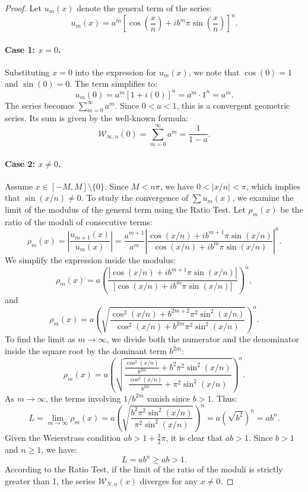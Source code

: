\documentclass[reqno,11pt]{amsart}
\theoremstyle{definition}
\begin{document}
\begin{proof}
Let $u_m(x)$ denote the general term of the series:
\[
    u_m(x) = a^m \left[ \cos\left(\frac{x}{n}\right) + i b^m \pi \sin\left(\frac{x}{n}\right) \right]^n.
\]

\paragraph{Case 1: $x = 0$.}
Substituting $x=0$ into the expression for $u_m(x)$, we note that $\cos(0)=1$ and $\sin(0)=0$. The term simplifies to:
\[ u_m(0) = a^m [ 1 + i(0) ]^n = a^m \cdot 1^n = a^m. \]
The series becomes $\sum_{m=0}^{\infty} a^m$. Since $0 < a < 1$, this is a convergent geometric series. Its sum is given by the well-known formula:
\[ \mathcal{W}_{\infty, n}(0) = \sum_{m=0}^{\infty} a^m = \frac{1}{1-a}. \]

\paragraph{Case 2: $x \neq 0$.}
Assume $x \in [-M, M] \setminus \{0\}$. Since $M < n\pi$, we have $0 < |x/n| < \pi$, which implies that $\sin(x/n) \neq 0$. To study the convergence of $\sum u_m(x)$, we examine the limit of the modulus of the general term using the Ratio Test. Let $\rho_m(x)$ be the ratio of the moduli of consecutive terms:
\[
    \rho_m(x) = \left| \frac{u_{m+1}(x)}{u_m(x)} \right| = \frac{a^{m+1}}{a^m} \left| \frac{\cos(x/n) + i b^{m+1} \pi \sin(x/n)}{\cos(x/n) + i b^m \pi \sin(x/n)} \right|^n.
\]
We simplify the expression inside the modulus:
\[
    \rho_m(x) = a \left( \frac{|\cos(x/n) + i b^{m+1} \pi \sin(x/n)|}{|\cos(x/n) + i b^m \pi \sin(x/n)|} \right)^n,
\]
and
\[
    \rho_m(x) = a \left( \sqrt{ \frac{\cos^2(x/n) + b^{2m+2} \pi^2 \sin^2(x/n)}{\cos^2(x/n) + b^{2m} \pi^2 \sin^2(x/n)} } \right)^n.
\]
To find the limit as $m \to \infty$, we divide both the numerator and the denominator inside the square root by the dominant term $b^{2m}$:
\[
    \rho_m(x) = a \left( \sqrt{ \frac{\frac{\cos^2(x/n)}{b^{2m}} + b^2 \pi^2 \sin^2(x/n)}{\frac{\cos^2(x/n)}{b^{2m}} + \pi^2 \sin^2(x/n)} } \right)^n.
\]
As $m \to \infty$, the terms involving $1/b^{2m}$ vanish since $b > 1$. Thus:
\[
    L = \lim_{m \to \infty} \rho_m(x) = a \left( \sqrt{ \frac{b^2 \pi^2 \sin^2(x/n)}{\pi^2 \sin^2(x/n)} } \right)^n = a ( \sqrt{b^2} )^n = a b^n.
\]
Given the Weierstrass condition $ab > 1 + \frac{3}{2}\pi$, it is clear that $ab > 1$. Since $b > 1$ and $n \ge 1$, we have:
\[ L = a b^n \ge ab > 1. \]
According to the Ratio Test, if the limit of the ratio of the moduli is strictly greater than 1, the series $\mathcal{W}_{N, n}(x)$ diverges for any $x \neq 0$.
\end{proof}
\end{document}
